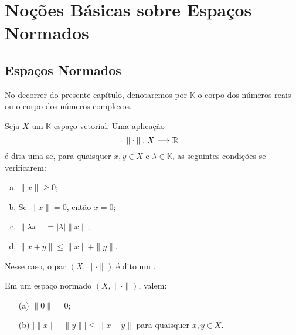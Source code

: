 
\chapter{Noções Básicas sobre Espaços Normados}

\section{Espaços Normados}
No decorrer do presente capítulo, denotaremos por $\mathbb K$ o corpo dos números reais ou o corpo dos números complexos.
%

\begin{definition}\label{norma}
    Seja $X$ um $\mathbb K$-espaço vetorial. Uma aplicação
    \[
    \displaystyle \| \cdot \|: X\longrightarrow \mathbb{R}
    \]
    é dita uma   se, para quaisquer $x,y\in X$ e $\lambda \in \mathbb K$, as seguintes condições se verificarem:
    \begin{enumerate}[(a)]
    \item $\|x\|\geq 0$;
    \item Se $\|x\|=0$, então $x=0$;
    \item $\|\lambda x\|=|\lambda| \|x\|$;
    \item $\|x+y\|\leq \|x\|+\|y\|$.
    \end{enumerate}
    Nesse caso, o par $(X,\|\cdot\|)$ é dito um  .
\end{definition}

\begin{remark}
Em um espaço normado $(X,\|\cdot\|)$, valem:
    \begin{itemize}
    \item[(a)] $\|0\|=0$;
    \item[(b)] $|\|x\|-\|y\|| \leq \|x-y\|$ para quaisquer $x,y \in X$.
    \end{itemize}
\end{remark}

